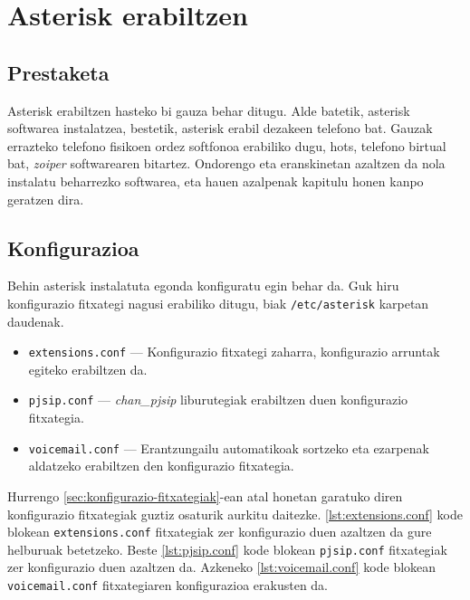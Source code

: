 \chapter{Asterisk erabiltzen}

\localtableofcontents

\section{Prestaketa}

Asterisk erabiltzen hasteko bi gauza behar ditugu. Alde batetik, asterisk softwarea instalatzea, bestetik, asterisk erabil dezakeen telefono bat. Gauzak errazteko telefono fisikoen ordez softfonoa erabiliko dugu, hots, telefono birtual bat, \textit{zoiper} softwarearen bitartez. Ondorengo  eta  eranskinetan azaltzen da nola instalatu beharrezko softwarea, eta hauen azalpenak kapitulu honen kanpo geratzen dira.

\section{Konfigurazioa}

Behin asterisk instalatuta egonda konfiguratu egin behar da. Guk hiru konfigurazio fitxategi nagusi erabiliko ditugu, biak \texttt{/etc/asterisk} karpetan daudenak.
\begin{itemize}
    \item \texttt{extensions.conf} --- Konfigurazio fitxategi zaharra, konfigurazio arruntak egiteko erabiltzen da.
    \item \texttt{pjsip.conf} --- \textit{chan\_pjsip} liburutegiak erabiltzen duen konfigurazio fitxategia.
    \item \texttt{voicemail.conf} --- Erantzungailu automatikoak sortzeko eta ezarpenak aldatzeko erabiltzen den konfigurazio fitxategia.
\end{itemize}

Hurrengo \autoref{sec:konfigurazio-fitxategiak}-ean atal honetan garatuko diren konfigurazio fitxategiak guztiz osaturik aurkitu daitezke. \autoref{lst:extensions.conf} kode blokean \texttt{extensions.conf} fitxategiak zer konfigurazio duen azaltzen da gure helburuak betetzeko. Beste \autoref{lst:pjsip.conf} kode blokean \texttt{pjsip.conf} fitxategiak zer konfigurazio duen azaltzen da. Azkeneko \autoref{lst:voicemail.conf} kode blokean \texttt{voicemail.conf} fitxategiaren konfigurazioa erakusten da.

